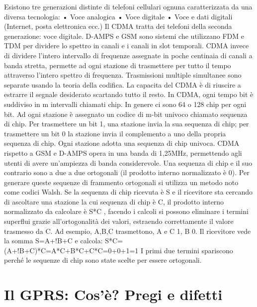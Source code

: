 Esistono tre generazioni distinte di telefoni cellulari ognuna caratterizzata da una diversa tecnologia:
•	Voce analogica
•	Voce digitale
•	Voce e dati digitali (Internet, posta elettronica ecc.)
Il CDMA tratta dei telefoni della seconda generazione: voce digitale.
D-AMPS e GSM sono sistemi che utilizzano FDM e TDM per dividere lo spettro in canali e i canali in slot temporali. CDMA invece di dividere l’intero intervallo di frequenze assegnate in poche centinaia di canali a banda stretta, permette ad ogni stazione di trasmettere per tutto il tempo attraverso l’intero spettro di frequenza. Trasmissioni multiple simultanee sono separate usando la teoria della codifica. La capacita del CDMA è di riuscire a estrarre il segnale desiderato scartando tutto il resto.
In CDMA, ogni tempo bit è suddiviso in m intervalli chiamati chip. In genere ci sono 64 o 128 chip per ogni bit. Ad ogni stazione è assegnato un codice di m-bit univoco chiamato sequenza di chip.
Per trasmettere un bit 1, una stazione invia la sua sequenza di chip; per trasmettere un bit 0 la stazione invia il complemento a uno della propria sequenza di chip.
Ogni stazione adotta una sequenza di chip univoca.
CDMA rispetto a GSM e D-AMPS opera in una banda di 1,25MHz, permettendo agli utenti di avere un’ampiezza di banda considerevole.
Una sequenza di chip e il suo contrario sono a due a due ortogonali (il prodotto interno normalizzato è 0). Per generare queste sequenze di frammento ortogonali si utilizza un metodo noto come codici Walsh. 
Se la sequenza di chip ricevuta è S e il ricevitore sta cercando di ascoltare una stazione la cui sequenza di chip è C, il prodotto interno normalizzato da calcolare è S*C , facendo i calcoli si possono eliminare i termini superflui grazie all’ortogonalità dei valori, estraendo correttamente il valore trasmesso da C. 
Ad esempio, A,B,C trasmettono, A e C 1, B 0. Il ricevitore vede la somma S=A+!B+C e calcola:
S*C=(A+!B+C)*C=A*C+B*C+C*C=0+0+1=1
I primi due termini spariscono perché le sequenze di chip sono state scelte per essere ortogonali.

\section{Il GPRS: Cos’è? Pregi e difetti}


